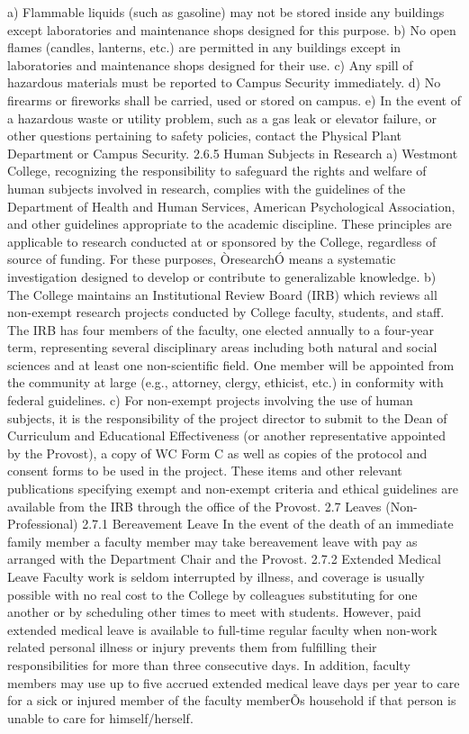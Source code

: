 \documentclass[letterpaper, 11pt]{article}
\begin{document}
	a) Flammable liquids (such as gasoline) may not be stored inside any buildings except laboratories and maintenance shops designed for this purpose.
	b) No open flames (candles, lanterns, etc.) are permitted in any buildings except in laboratories and maintenance shops designed for their use.
	c) Any spill of hazardous materials must be reported to Campus Security immediately.
	d) No firearms or fireworks shall be carried, used or stored on campus.
	e) In the event of a hazardous waste or utility problem, such as a gas leak or elevator failure, or other questions pertaining to safety policies, contact the Physical Plant Department or Campus Security.
	2.6.5 Human Subjects in Research
	a) Westmont College, recognizing the responsibility to safeguard the rights and welfare of human subjects involved in research, complies with the guidelines of the Department of Health and Human Services, American Psychological Association, and other guidelines appropriate to the academic discipline.  These principles are applicable to research conducted at or sponsored by the College, regardless of source of funding.  For these purposes, ÒresearchÓ means a systematic investigation designed to develop or contribute to generalizable knowledge.
	b) The College maintains an Institutional Review Board (IRB) which reviews all non-exempt research projects conducted by College faculty, students, and staff.  The IRB has four members of the faculty, one elected annually to a four-year term, representing several disciplinary areas including both natural and social sciences and at least one non-scientific field.  One member will be appointed from the community at large (e.g., attorney, clergy, ethicist, etc.) in conformity with federal guidelines.
	c) For non-exempt projects involving the use of human subjects, it is the responsibility of the project director to submit to the Dean of Curriculum and Educational Effectiveness (or another representative appointed by the Provost), a copy of WC Form C as well as copies of the protocol and consent forms to be used in the project.  These items and other relevant publications specifying exempt and non-exempt criteria and ethical guidelines are available from the IRB through the office of the Provost.
	2.7 Leaves (Non-Professional)
	2.7.1 Bereavement Leave
	In the event of the death of an immediate family member a faculty member may take bereavement leave with pay as arranged with the Department Chair and the Provost.
	2.7.2 Extended Medical Leave
	Faculty work is seldom interrupted by illness, and coverage is usually possible with no real cost to the College by colleagues substituting for one another or by scheduling other times to meet with students.  However, paid extended medical leave is available to full-time regular faculty when non-work related personal illness or injury prevents them from fulfilling their responsibilities for more than three consecutive days.  In addition, faculty members may use up to five accrued extended medical leave days per year to care for a sick or injured member of the faculty memberÕs household if that person is unable to care for himself/herself.
\end{document}
